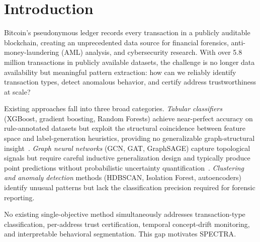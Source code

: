 \documentclass[journal]{IEEEtran}
\newcommand{\spectra}{\textsc{SPECTRA}}
\begin{document}
\maketitle

\section{Introduction}
\label{sec:introduction}

Bitcoin's pseudonymous ledger records every transaction in a publicly
auditable blockchain, creating an unprecedented data source for financial
forensics, anti-money-laundering (AML) analysis, and cybersecurity research.
With over \num{5.8} million transactions in publicly available datasets,
the challenge is no longer data availability but meaningful pattern extraction:
how can we reliably identify transaction types, detect anomalous behavior,
and certify address trustworthiness at scale?

Existing approaches fall into three broad categories.
\emph{Tabular classifiers} (XGBoost, gradient boosting, Random Forests)
achieve near-perfect accuracy on rule-annotated datasets but exploit the
structural coincidence between feature space and label-generation heuristics,
providing no generalizable graph-structural insight~\cite{Chainalysis2023}.
\emph{Graph neural networks} (GCN, GAT, GraphSAGE) capture topological
signals but require careful inductive generalization design and typically
produce point predictions without probabilistic uncertainty
quantification~\cite{Weber2019,Pareja2020}.
\emph{Clustering and anomaly detection} methods (HDBSCAN, Isolation Forest,
autoencoders) identify unusual patterns but lack the classification precision
required for forensic reporting.

No existing single-objective method simultaneously addresses
transaction-type classification, per-address trust certification,
temporal concept-drift monitoring, and interpretable behavioral segmentation.
This gap motivates \spectra{}.

\end{document}
